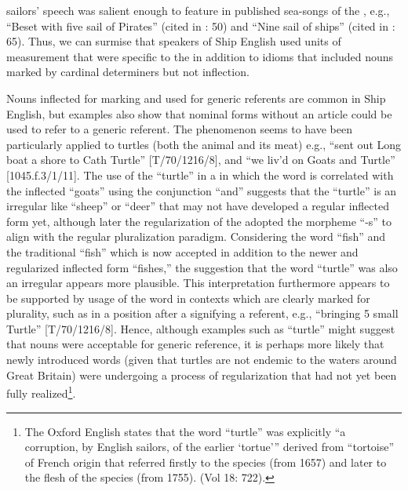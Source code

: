 sailors’ speech was salient enough to feature in published sea-songs of the , e.g., “Beset with five sail of Pirates” (cited in \citealt{Palmer1986}: 50) and “Nine sail of ships” (cited in \citealt{Palmer1986}: 65). Thus, we can surmise that speakers of Ship English used   units of measurement that were specific to the  in addition to idioms that included  nouns marked by cardinal determiners but not inflection. 

Nouns inflected for  marking and used for generic referents are common in Ship English, but examples also show that  nominal forms without an article could be used to refer to a generic referent. The phenomenon seems to have been particularly applied to turtles (both the animal and its meat) e.g., “sent out Long boat a shore to Cath Turtle” [T/70/1216/8], and “we liv’d on Goats and Turtle” [1045.f.3/1/11]. The use of the   “turtle” in a  in which the word is correlated with the inflected  “goats” using the conjunction “and” suggests that the  “turtle” is an irregular  like “sheep” or “deer” that may not have developed a regular inflected form yet, although later the regularization of the  adopted the morpheme “-s” to align with the regular pluralization paradigm. Considering the word “fish” and the traditional   “fish” which is now accepted in addition to the newer and regularized inflected form “fishes,” the suggestion that the word “turtle” was also an irregular  appears more plausible. This interpretation furthermore appears to be supported by usage of the word in contexts which are clearly marked for plurality, such as in a position after a  signifying a  referent, e.g., “bringing 5 small Turtle” [T/70/1216/8]. Hence, although examples such as “turtle” might suggest that  nouns were acceptable for generic reference, it is perhaps more likely that newly introduced words (given that turtles are not endemic to the waters around Great Britain) were undergoing a process of regularization that had not yet been fully realized\footnote{The Oxford English \citet{Dictionary1989} states that the word “turtle” was explicitly “a corruption, by English sailors, of the earlier ‘tortue’” derived from “tortoise” of French origin that referred firstly to the species (from 1657) and later to the flesh of the species (from 1755). (Vol 18: 722).}. 

